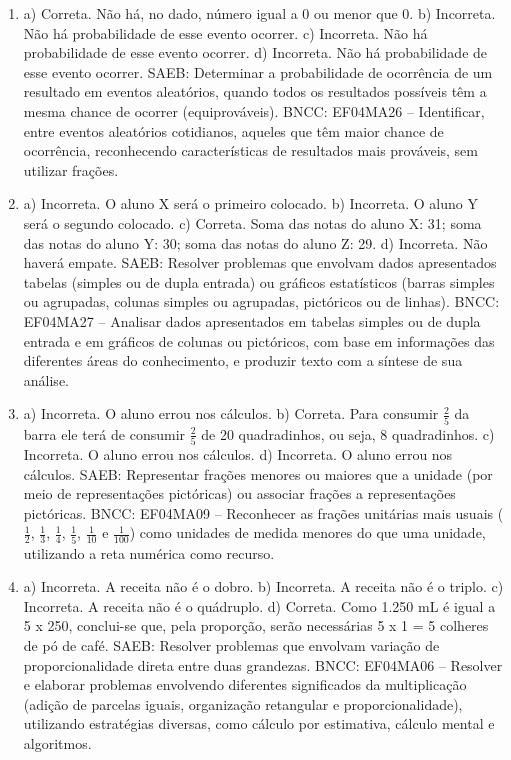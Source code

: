 \begin{enumerate}
\item
a) Correta. Não há, no dado, número igual a 0 ou menor que 0.
b) Incorreta. Não há probabilidade de esse evento ocorrer.
c) Incorreta. Não há probabilidade de esse evento ocorrer.
d) Incorreta. Não há probabilidade de esse evento ocorrer.
SAEB: Determinar a probabilidade de ocorrência de um
resultado em eventos aleatórios, quando todos os resultados possíveis
têm a mesma chance de ocorrer (equiprováveis).
BNCC: EF04MA26 -- Identificar, entre eventos aleatórios cotidianos, aqueles que têm maior chance de
ocorrência, reconhecendo características de resultados mais prováveis, sem utilizar frações.

\item
a) Incorreta. O aluno X será o primeiro colocado.
b) Incorreta. O aluno Y será o segundo colocado.
c) Correta. Soma das notas do aluno X: 31; soma das notas do aluno Y: 30; soma das notas do aluno Z: 29.
d) Incorreta. Não haverá empate.
SAEB: Resolver problemas que envolvam dados apresentados
tabelas (simples ou de dupla entrada) ou gráficos estatísticos (barras
simples ou agrupadas, colunas simples ou agrupadas, pictóricos ou de
linhas).
BNCC: EF04MA27 -- Analisar dados apresentados em tabelas simples ou de dupla entrada e em gráficos de
colunas ou pictóricos, com base em informações das diferentes áreas do conhecimento, e produzir
texto com a síntese de sua análise.

\item
a) Incorreta. O aluno errou nos cálculos.
b) Correta. Para consumir $\frac{2}{5}$ da barra ele terá de consumir $\frac{2}{5}$ de 20 quadradinhos, ou seja, 8 quadradinhos.
c) Incorreta. O aluno errou nos cálculos.
d) Incorreta. O aluno errou nos cálculos.
SAEB: Representar frações menores ou maiores que a unidade
(por meio de representações pictóricas) ou associar frações a
representações pictóricas.
BNCC: EF04MA09 -- Reconhecer as frações unitárias mais usuais ($\frac{1}{2}$, $\frac{1}{3}$, $\frac{1}{4}$, $\frac{1}{5}$, $\frac{1}{10}$ e $\frac{1}{100}$) como
unidades de medida menores do que uma unidade, utilizando a reta numérica como recurso.

\item
a) Incorreta. A receita não é o dobro.
b) Incorreta. A receita não é o triplo.
c) Incorreta. A receita não é o quádruplo.
d) Correta. Como 1.250 mL é igual a 5 x 250, conclui-se que, pela proporção, serão necessárias 5 x 1 = 5 colheres de pó de café.
SAEB: Resolver problemas que envolvam variação de
proporcionalidade direta entre duas grandezas.
BNCC: EF04MA06 -- Resolver e elaborar problemas envolvendo diferentes significados da multiplicação
(adição de parcelas iguais, organização retangular e proporcionalidade), utilizando estratégias
diversas, como cálculo por estimativa, cálculo mental e algoritmos.


\end{enumerate}
